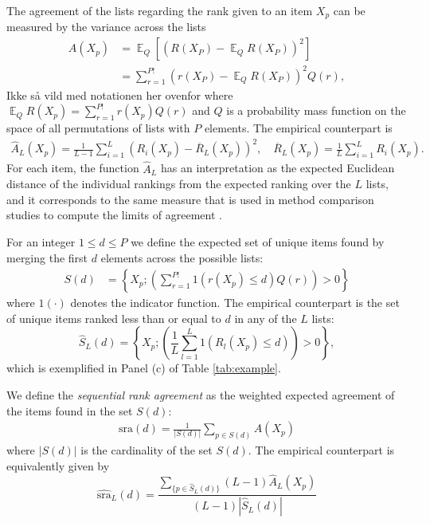 \documentclass[12pt,a4paper]{article}
\newcommand{\nn}{\nonumber}
\DeclareMathOperator{\E}{\mathbb{E}}
\theoremstyle{plain}
\begin{document}
The agreement of the lists regarding the rank given to an item $X_p$
can be measured by the variance across the lists
\begin{align}
  A(X_p) &= \E_Q\left[\left(R(X_P)-\E_Q R(X_P)\right)^2\right]\\
   &= \sum_{r=1}^{P!} \left(r(X_P)-\E_Q R(X_P)\right)^2 Q(r),\nn
\end{align}
\textsf{Ikke så vild med notationen her ovenfor}
where $\E_Q R(X_p)=\sum_{r=1}^{P!} r(X_p)Q(r)$ and $Q$ is a probability mass function
on the space of all permutations of lists with $P$ elements.
The empirical counterpart is
\begin{align}
\widehat{A}_L(X_p) = \frac{1}{L-1}\sum_{i=1}^L (R_i(X_p) - \overline{R}_L(X_p))^2, \quad \overline{R}_L(X_p) = \frac{1}{L}\sum_{i=1}^L R_i(X_p).\label{eq:empDistance}
\end{align}
For each item, the function $\widehat{A}_L$ has an interpretation as the expected
Euclidean distance of the individual rankings from the expected
ranking over the $L$ lists, and it corresponds to the same measure
that is used in method comparison studies to compute the limits of
agreement \citep{alt:bland:1983}.

For an integer $1\le d\le P$ we define the expected set of unique
items found by merging the first $d$ elements across the possible
lists:
\begin{align}
S(d) &= \left\{X_p; \left(\sum_{r=1}^{P!} 1\left(r(X_p)\le d\right) Q(r)\right) >0\right\}\label{eq:sumset}
\end{align}
where $1(\cdot)$ denotes the indicator function.
The empirical counterpart is the set of unique items ranked less than or
equal to $d$ in any of the $L$ lists:
\begin{equation}
\widehat{S}_{L}(d) = \left\{X_p; \left(\frac{1}{L}\sum_{l=1}^L 1\left(R_l(X_p)\le d\right)\right)>0\right\},
\end{equation}
which is exemplified in Panel (c) of Table \ref{tab:example}.

We define the \emph{sequential rank agreement} as the weighted
expected agreement of the items found in the set $S(d)$:
\begin{align}
  \textrm{sra}(d) = \frac{1}{|S(d)|}\sum_{p \in S(d)}A(X_p)\label{def:sra}
\end{align}
where $|S(d)|$ is the cardinality of the set $S(d)$.
The empirical counterpart is equivalently given by
\begin{equation}
  \widehat{\textrm{sra}}_L(d) = \frac{\sum_{\{p \in \widehat{S}_{L}(d)\}}(L-1)\widehat{A}_L(X_p)}{(L-1)|\widehat {S}_{L}(d)|}\label{def:sraEst}
\end{equation}
\end{document}
